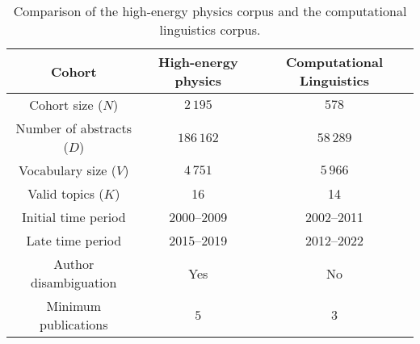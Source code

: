 \begin{table}
\centering
\caption{Comparison of the high-energy physics corpus and the computational linguistics corpus.}
\label{table:corpora}
\begin{tabular}{|c|c|c|}
\toprule
Cohort & High-energy physics & Computational Linguistics \\
\midrule
Cohort size ($N$)         &            $2\,195$ &                     $578$ \\
Number of abstracts ($D$) &          $186\,162$ &                 $58\,289$ \\
Vocabulary size ($V$)     &            $4\,751$ &                  $5\,966$ \\
Valid topics ($K$)        &                  16 &                        14 \\
Initial time period       &          2000--2009 &                2002--2011 \\
Late time period          &          2015--2019 &                2012--2022 \\
Author disambiguation     &                 Yes &                        No \\
Minimum publications      &                 $5$ &                       $3$ \\
\bottomrule
\end{tabular}
\end{table}
